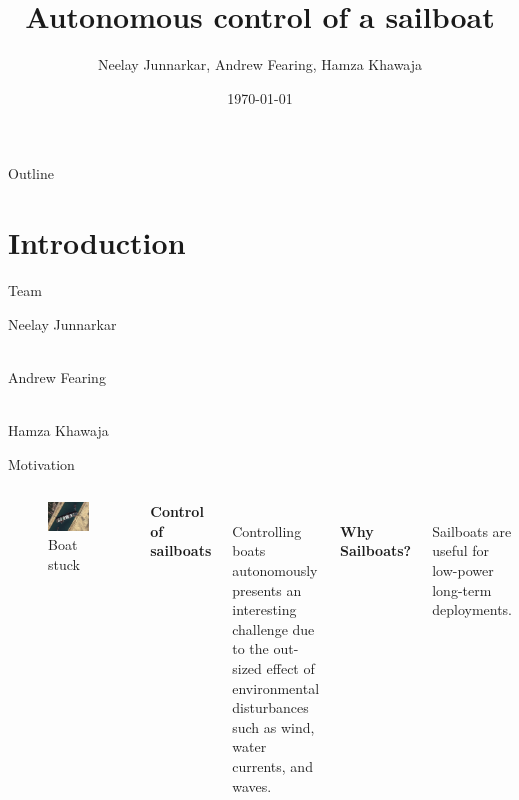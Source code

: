 \documentclass[10pt,xcolor={table,dvipsnames},t]{beamer}
\title[Autosailboat]{Autonomous control of a sailboat}
\author{Neelay Junnarkar, Andrew Fearing, Hamza Khawaja}
\date{\today}
\begin{document}
\begin{frame}
  \titlepage
\end{frame}

\begin{frame}{Outline}
 \tableofcontents
\end{frame}
\section{Introduction}
\begin{frame}{Team}

Neelay Junnarkar

\hfill\\
Andrew Fearing

\hfill\\
Hamza Khawaja
\end{frame}


\begin{frame}{Motivation}
\begin{columns}
    \begin{figure}
        \centering
        \includegraphics{documents/figures/Suez_Canal_blocked_by_Ever_Given_March_27_2021.jpg}
        \caption{Boat stuck}
        \label{fig:boat_stuck}
    \end{figure}  
    \textbf{Control of sailboats}
    
    \hfill\\
    Controlling boats autonomously presents an interesting challenge due to the out-sized effect of environmental disturbances such as wind, water currents, and waves. 
    
    \hfill\\
    \textbf{Why Sailboats?}
    
    \hfill\\
    Sailboats are useful for low-power long-term deployments.
    
\end{columns}
\end{frame}
\end{document}
